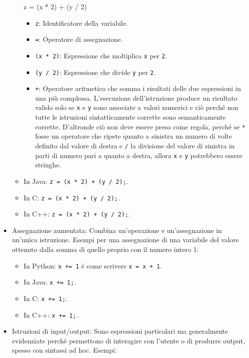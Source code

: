 \documentclass[
  letterpaper,
]{scrbook}
\newenvironment{Shaded}{\begin{snugshade}}{\end{snugshade}}
\newcommand{\DecValTok}[1]{\textcolor[rgb]{0.68,0.00,0.00}{#1}}
\newcommand{\NormalTok}[1]{\textcolor[rgb]{0.00,0.23,0.31}{#1}}
\newcommand{\OperatorTok}[1]{\textcolor[rgb]{0.37,0.37,0.37}{#1}}
\providecommand{\tightlist}{%
  \setlength{\itemsep}{0pt}\setlength{\parskip}{0pt}}\usepackage{longtable,booktabs,array}
\begin{document}
\begin{itemize}
\begin{itemize}
\begin{Shaded}
\begin{Highlighting}[]
\NormalTok{z }\OperatorTok{=}\NormalTok{ (x }\OperatorTok{*} \DecValTok{2}\NormalTok{) }\OperatorTok{+}\NormalTok{ (y }\OperatorTok{/} \DecValTok{2}\NormalTok{)}
\end{Highlighting}
\end{Shaded}

    \begin{itemize}
    \tightlist
    \item
      \texttt{z}: Identificatore della variabile.
    \item
      \texttt{=}: Operatore di assegnazione.
    \item
      \texttt{(x\ *\ 2)}: Espressione che moltiplica \texttt{x} per
      \texttt{2}.
    \item
      \texttt{(y\ /\ 2)}: Espressione che divide \texttt{y} per
      \texttt{2}.
    \item
      \texttt{+}: Operatore aritmetico che somma i risultati delle due
      espressioni in una più complessa. L'esecuzione dell'istruzione
      produce un risultato valido solo se \texttt{x} e \texttt{y} sono
      associate a valori numerici e ciò perché non tutte le istruzioni
      sintatticamente corrette sono semanticamente corrette. D'altronde
      ciò non deve essere preso come regola, perché se \texttt{*} fosse
      un operatore che ripete quanto a sinistra un numero di volte
      definito dal valore di destra e \texttt{/} la divisione del valore
      di sinistra in parti di numero pari a quanto a destra, allora
      \texttt{x} e \texttt{y} potrebbero essere stringhe.
    \end{itemize}
  \item
    In Java: \texttt{z\ =\ (x\ *\ 2)\ +\ (y\ /\ 2);}.
  \item
    In C: \texttt{z\ =\ (x\ *\ 2)\ +\ (y\ /\ 2);}.
  \item
    In C++: \texttt{z\ =\ (x\ *\ 2)\ +\ (y\ /\ 2);}.
  \end{itemize}
\item
  Assegnazione aumentata: Combina un'operazione e un'assegnazione in
  un'unica istruzione. Esempi per una assegnazione di una variabile del
  valore ottenuto dalla somma di quello proprio con il numero intero 1:

  \begin{itemize}
  \tightlist
  \item
    In Python: \texttt{x\ +=\ 1} è come scrivere \texttt{x\ =\ x\ +\ 1}.
  \item
    In Java: \texttt{x\ +=\ 1;}.
  \item
    In C: \texttt{x\ +=\ 1;}.
  \item
    In C++: \texttt{x\ +=\ 1;}.
  \end{itemize}
\item
  Istruzioni di input/output: Sono espressioni particolari ma
  generalmente evidenziate perché permettono di interagire con l'utente
  o di produrre output, spesso con sintassi ad hoc. Esempi:


\end{itemize}
\end{document}
